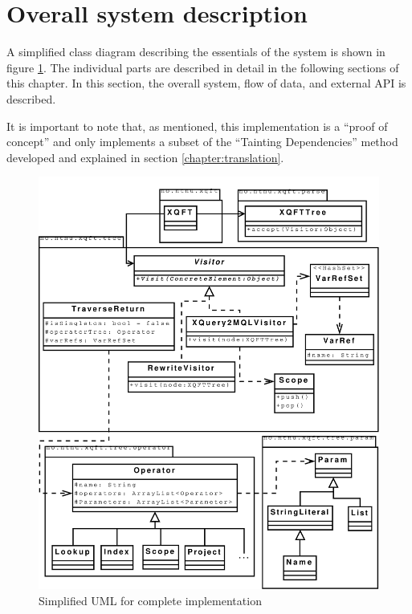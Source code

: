 \section{Overall system description}
A simplified class diagram describing the essentials of the system is shown in
figure \ref{fig:impl:sys:uml_complete}. The individual parts are described in
detail in the following sections of this chapter. In this section, the overall
system, flow of data, and external API is described.

It is important to note that, as mentioned, this implementation is a ``proof of
concept'' and only implements a subset of the ``Tainting Dependencies''
method developed and explained in section \ref{chapter:translation}. 

\newpage

\begin{figure}[!htp]
\begin{center}
\includegraphics[scale=0.45]{diagrams/complete_uml}
  \caption{Simplified UML for complete implementation}
  \label{fig:impl:sys:uml_complete}
\end{center}
\end{figure}

